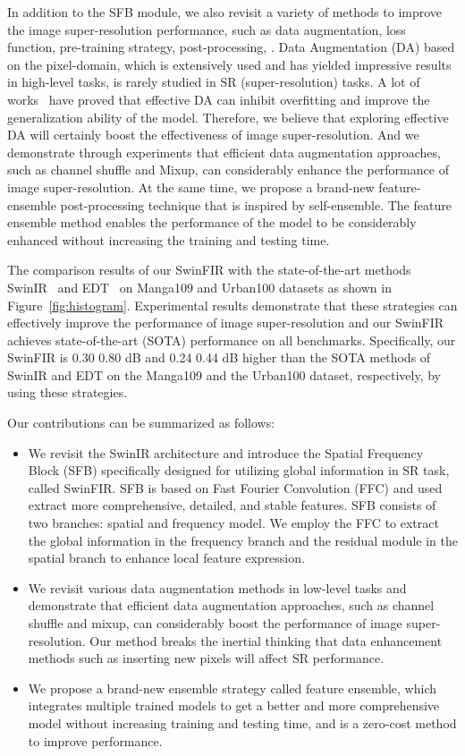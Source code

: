 \documentclass[10pt,twocolumn,letterpaper]{article}
\begin{document}
In addition to the SFB module, we also revisit a variety of methods to improve the image super-resolution performance, such as data augmentation, loss function, pre-training strategy, post-processing, \etc. Data Augmentation (DA) based on the pixel-domain, which is extensively used and has yielded impressive results in high-level tasks, is rarely studied in SR (super-resolution) tasks.  A lot of works~\cite{devries2017improved, hendrycks2019benchmarking, yun2019cutmix, zhang2017mixup} have proved that effective DA can inhibit overfitting and improve the generalization ability of the model. Therefore, we believe that exploring effective DA will certainly boost the effectiveness of image super-resolution. And we demonstrate through experiments that efficient data augmentation approaches, such as channel shuffle and Mixup, can considerably enhance the performance of image super-resolution. At the same time, we propose a brand-new feature-ensemble post-processing technique that is inspired by self-ensemble. The feature ensemble method enables the performance of the model to be considerably enhanced without increasing the training and testing time. 

The comparison results of our SwinFIR with the state-of-the-art methods SwinIR~\cite{ liang2021swinir} and EDT~\cite{li2021efficient} on Manga109 and Urban100 datasets as shown in Figure~\ref{fig:histogram}. Experimental results demonstrate that these strategies can effectively improve the performance of image super-resolution and our SwinFIR achieves state-of-the-art (SOTA) performance on all benchmarks. Specifically, our SwinFIR is 0.30  0.80 dB and 0.24  0.44 dB higher than the SOTA methods of SwinIR and EDT on the Manga109 and the Urban100 dataset, respectively, by using these strategies.



Our contributions can be summarized as follows:
\begin{itemize}
\item We revisit the SwinIR architecture and introduce the Spatial Frequency Block (SFB) specifically designed for utilizing global information in SR task, called SwinFIR. SFB is based on Fast Fourier Convolution (FFC) and used extract more comprehensive, detailed, and stable features. SFB consists of two branches: spatial and frequency model. We employ the FFC to extract the global information in the frequency branch and the residual module in the spatial branch to enhance local feature expression.

\item We revisit various data augmentation methods in low-level tasks and demonstrate that efficient data augmentation approaches, such as channel shuffle and mixup, can considerably boost the performance of image super-resolution. Our method breaks the inertial thinking that data enhancement methods such as inserting new pixels will affect SR performance.

\item We propose a brand-new ensemble strategy called feature ensemble, which integrates multiple trained models to get a better and more comprehensive model without increasing training and testing time, and is a zero-cost method to improve performance.
\end{itemize}
\end{document}

